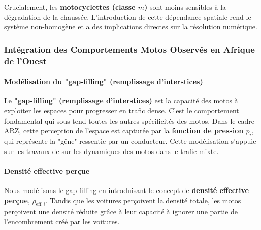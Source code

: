 
Crucialement, les \textbf{motocyclettes (classe $m$)} sont moins sensibles à la dégradation de la chaussée. L'introduction de cette dépendance spatiale rend le système non-homogène et a des implications directes sur la résolution numérique.

\subsubsection{Intégration des Comportements Motos Observés en Afrique de l'Ouest}
\paragraph{Modélisation du "gap-filling" (remplissage d'interstices)}
Le \textbf{"gap-filling" (remplissage d'interstices)} est la capacité des motos à exploiter les espaces pour progresser en trafic dense. C'est le comportement fondamental qui sous-tend toutes les autres spécificités des motos. Dans le cadre ARZ, cette perception de l'espace est capturée par la \textbf{fonction de pression $p_i$}, qui représente la "gêne" ressentie par un conducteur. Cette modélisation s'appuie sur les travaux de \cite{Lee2009} sur les dynamiques des motos dans le trafic mixte.

\paragraph{Densité effective perçue}
Nous modélisons le gap-filling en introduisant le concept de \textbf{densité effective perçue}, $\rho_{\text{eff},i}$. Tandis que les voitures perçoivent la densité totale, les motos perçoivent une densité réduite grâce à leur capacité à ignorer une partie de l'encombrement créé par les voitures.

